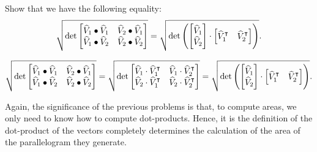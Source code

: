\documentclass{ximera}
\begin{document}
\begin{problem}
Show that we have the following equality:
\[
\sqrt{
  \det
\begin{bmatrix}
\hat{V}_{1}\bullet\hat{V}_{1} & \hat{V}_{2}\bullet\hat{V}_{1}\\
\hat{V}_{1}\bullet\hat{V}_{2} & \hat{V}_{2}\bullet\hat{V}_{2}%
\end{bmatrix}}
=
\sqrt{
  \det\left(
\begin{bmatrix}
\hat{V}_{1} \\
\hat{V}_{2}
\end{bmatrix}
\cdot
\begin{bmatrix}
\hat{V}_{1}^\transpose  & \hat{V}_{2}^\transpose 
\end{bmatrix}\right)}.
\]

\begin{freeResponse}
\[
\sqrt{
  \det
\begin{bmatrix}
\hat{V}_{1}\bullet\hat{V}_{1} & \hat{V}_{2}\bullet\hat{V}_{1}\\
\hat{V}_{1}\bullet\hat{V}_{2} & \hat{V}_{2}\bullet\hat{V}_{2}%
\end{bmatrix}}
=\sqrt{
  \det
\begin{bmatrix}
\hat{V}_{1}\cdot \hat{V}_{1}^\transpose & \hat{V}_{1}\cdot \hat{V}_{2}^\transpose\\
\hat{V}_{2}\cdot \hat{V}_{1}^\transpose & \hat{V}_{2}\cdot \hat{V}_{2}^\transpose%
\end{bmatrix}}
=\sqrt{
  \det\left(
\begin{bmatrix}
\hat{V}_{1} \\
\hat{V}_{2}
\end{bmatrix}
\cdot
\begin{bmatrix}
\hat{V}_{1}^\transpose  & \hat{V}_{2}^\transpose 
\end{bmatrix}\right)}.
\]
\end{freeResponse}
\end{problem}

Again, the significance of the previous problems is that, to compute
areas, we only need to know how to compute dot-products. Hence, it is
the definition of the dot-product of the vectors completely determines
the calculation of the area of the parallelogram they generate.


\end{document}
